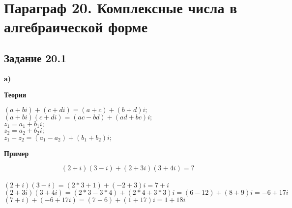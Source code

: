\documentclass[12pt]{article}
\begin{document}
\tableofcontents
\newpage
\section{Параграф 20. Комплексные числа в алгебраической форме}
\subsection{Задание 20.1}
\textbf{a)}\\
\begin{center}\textbf{Теория}\end{center}
$ (a+bi) + (c+di) = (a+c)+(b+d)i; $ \\
$ (a+bi)(c+di) = (ac-bd)+(ad+bc)i; $\\
$ z_1 = a_1+b_1i;$\\
$ z_2 = a_2+b_2i;$\\
$ z_1 - z_2 = (a_1-a_2)+(b_1+b_2)i; $
\begin{center}\textbf{Пример}\end{center}
$$(2+i)(3-i)+(2+3i)(3+4i) = ?$$\\
$(2+i)(3-i)=(2*3+1)+(-2+3)i = 7+i$\\
$(2+3i)(3+4i) =(2*3-3*4)+( 2* 4+3*3)i=(6-12)+(8+9)i=-6+17i$\\
$(7+i)+(-6+17i)=(7-6)+(1+17)i=1+18i$
\end{document}

